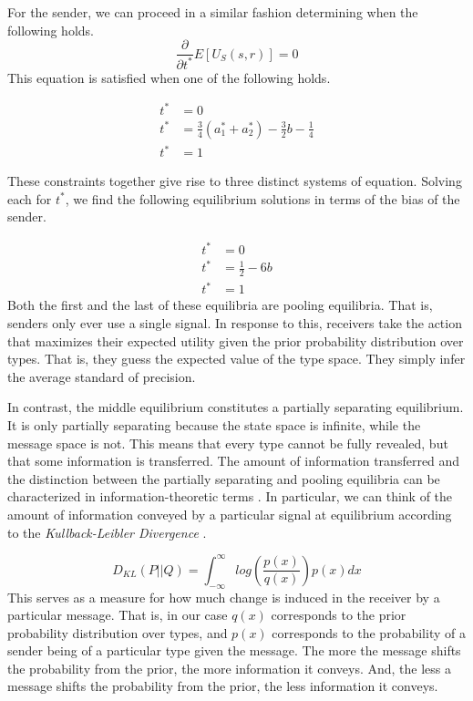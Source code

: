 For the sender, we can proceed in a similar fashion determining when the following holds.
\begin{equation}
 \frac{\partial}{\partial t^*}E[U_S(s, r)] = 0
\end{equation}
This equation is satisfied when one of the following holds.

\begin{equation}
     \begin{split}
 	t^* &= 0\\
	t^* &= \frac{3}{4}(a_1^* + a_2^*) - \frac{3}{2}b - \frac{1}{4}\\
	t^* &= 1
     \end{split}
\end{equation}

These constraints together give rise to three distinct systems of equation. Solving each for $t^*$, we find the following equilibrium solutions in terms of the bias of the sender.

\begin{equation}
\begin{split}
     t^* &= 0\\
     t^* &= \frac{1}{2} - 6b\\
     t^* &= 1
\end{split}
\end{equation}
Both the first and the last of these equilibria are pooling equilibria. That is, senders only ever use a single signal. In response to this, receivers take the action that maximizes their expected utility given the prior probability distribution over types. That is, they guess the expected value of the type space. They simply infer the average standard of precision.

In contrast, the middle equilibrium constitutes a partially separating equilibrium. It is only partially separating because the state space is infinite, while the message space is not. This means that every type cannot be fully revealed, but that some information is transferred. The amount of information transferred and the distinction between the partially separating and pooling equilibria can be characterized in information-theoretic terms \citep{shannon:1948}. In particular, we can think of the amount of information conveyed by a particular signal at equilibrium according to the \emph{Kullback-Leibler Divergence} \citeyearpar{kullback-leibler1951divergence}.

\begin{equation}
     D_{KL}(P || Q) = \int_{-\infty}^{\infty} log\left( \frac{p(x)}{q(x)}  \right)p(x) dx
\end{equation}
This serves as a measure for how much change is induced in the receiver by a particular message. That is, in our case $q(x)$ corresponds to the prior probability distribution over types, and $p(x)$ corresponds to the probability of a sender being of a particular type given the message. The more the message shifts the probability from the prior, the more information it conveys. And, the less a message shifts the probability from the prior, the less information it conveys. 

